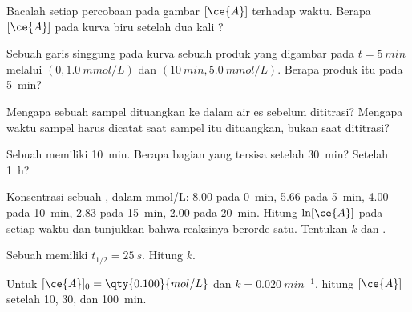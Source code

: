 \begin{exercise}[$\star$]\label{exo:g12:reaction-rates:2}
Bacalah  setiap percobaan pada gambar $[\ce{A}]$ terhadap
waktu. Berapa $[\ce{A}]$ pada kurva biru setelah dua kali ?
\end{exercise}

\begin{exercise}[$\star$]\label{exo:g12:reaction-rates:3}
Sebuah garis singgung pada kurva sebuah produk yang digambar pada
$t = \qty{5}{min}$ melalui $(0, \qty{1.0}{mmol/L})$ dan
$(\qty{10}{min}, \qty{5.0}{mmol/L})$. Berapa  produk
itu pada \qty{5}{min}?
\end{exercise}

\begin{exercise}[$\star$]\label{exo:g12:reaction-rates:4}
Mengapa sebuah sampel dituangkan ke dalam air es sebelum dititrasi?
Mengapa waktu sampel harus dicatat saat sampel itu dituangkan, bukan
saat dititrasi?
\end{exercise}

\begin{exercise}[$\star$]\label{exo:g12:reaction-rates:5}
Sebuah  memiliki  \qty{10}{min}. Berapa
bagian  yang tersisa setelah \qty{30}{min}? Setelah
\qty{1}{h}?
\end{exercise}

\begin{exercise}[$\star\star$]\label{exo:g12:reaction-rates:6}
Konsentrasi sebuah , dalam \si{mmol/L}: 8.00 pada
\qty{0}{min}, 5.66 pada \qty{5}{min}, 4.00 pada \qty{10}{min}, 2.83
pada \qty{15}{min}, 2.00 pada \qty{20}{min}. Hitung $\ln[\ce{A}]$ pada
setiap waktu dan tunjukkan bahwa reaksinya berorde satu. Tentukan $k$
dan .
\end{exercise}

\begin{exercise}[$\star\star$]\label{exo:g12:reaction-rates:7}
Sebuah  memiliki $t_{1/2} = \qty{25}{s}$. Hitung $k$.
\end{exercise}

\begin{exercise}[$\star\star$]\label{exo:g12:reaction-rates:8}
Untuk $[\ce{A}]_0 = \qty{0.100}{mol/L}$ dan $k = \qty{0.020}{min^{-1}}$,
hitung $[\ce{A}]$ setelah 10, 30, dan \qty{100}{min}.
\end{exercise}

